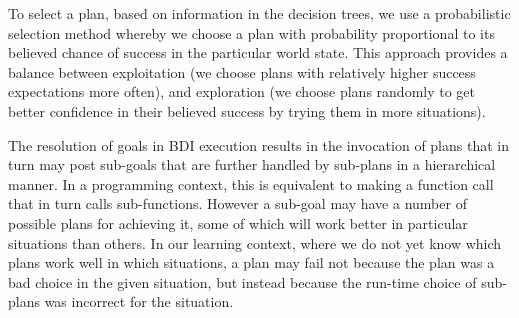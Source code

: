 To select a plan, based on information in the decision trees, we use a
probabilistic selection method whereby we choose a plan with
probability proportional to its believed chance of success in the
particular world state. This approach provides a balance between
exploitation (we choose plans with relatively higher success expectations
more often), and exploration (we choose plans randomly to get better
confidence in their believed success by trying them in more 
situations).

The resolution of goals in BDI execution results in 
the invocation of plans that in turn may post sub-goals that are further
handled by sub-plans in a hierarchical manner. In a programming context,
this is equivalent to making a function call that in turn calls sub-functions.
However a sub-goal may have a number of possible plans for achieving
it, some of which will work better in particular situations than
others. In our learning context, where we do not yet know which plans
work well in which situations, a plan may fail not because the plan
was a bad choice in the given situation, but instead because the
run-time choice of sub-plans was incorrect for the situation.



